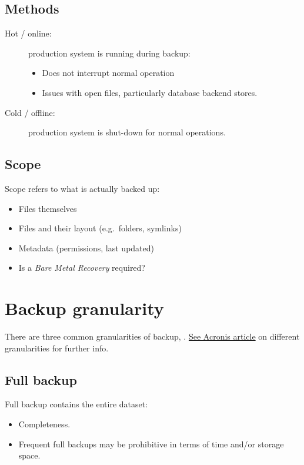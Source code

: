 \subsection{Methods}\label{methods}

\begin{description}
\item[Hot / online:]
production system is running during backup:

\begin{itemize}
\item
  Does not interrupt normal operation
\item
  Issues with open files, particularly database backend stores.
\end{itemize}
\item[Cold / offline:]
production system is shut-down for normal operations.
\end{description}

\subsection{Scope}\label{scope}

Scope refers to what is actually backed up:

\begin{itemize}
\item
  Files themselves
\item
  Files and their layout (e.g.~folders, symlinks)
\item
  Metadata (permissions, last updated)
\item
  Is a \emph{Bare Metal Recovery} required?
\end{itemize}

\section{Backup granularity}\label{backup-granularity}

There are three common granularities of backup, .
\href{https://www.acronis.com/en-us/articles/incremental-differential-backups/}{See
Acronis article} on different granularities for further info.

\subsection{Full backup}\label{full-backup}

Full backup contains the entire dataset:

\begin{itemize}
\item
  Completeness.
\item
  Frequent full backups may be prohibitive in terms of time and/or
  storage space.
\end{itemize}

